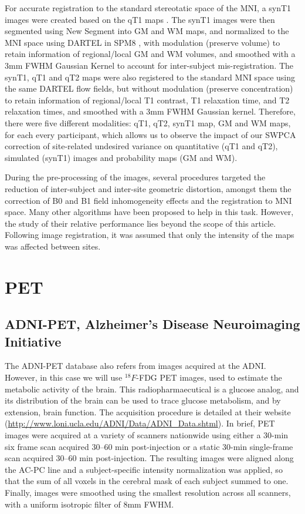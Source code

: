 For accurate registration to the standard stereotatic space of the \ac{MNI}, a \ac{synT1} images were created based on the \ac{qT1} maps \cite{Ecker2013,Ecker2012,Lai2012}. The \ac{synT1} images were then segmented using New Segment into \ac{GM} and \ac{WM} maps, and normalized to the \ac{MNI} space using DARTEL in SPM8 \cite{spm_book}, with modulation (preserve volume) to retain information of regional/local \ac{GM} and \ac{WM} volumes, and smoothed with a 3mm FWHM Gaussian Kernel to account for inter-subject mis-registration. The \ac{synT1}, \ac{qT1} and \ac{qT2} maps were also registered to the standard \ac{MNI} space using the same DARTEL flow fields, but without modulation (preserve concentration) to retain information of regional/local T1 contrast, T1 relaxation time, and T2 relaxation times, and smoothed with a 3mm FWHM Gaussian kernel. Therefore, there were five different modalities: \ac{qT1}, \ac{qT2}, \ac{synT1} map, \ac{GM} and \ac{WM} maps, for each every participant, which allows us to observe the impact of our \ac{SWPCA} correction of site-related undesired variance on quantitative (\ac{qT1} and \ac{qT2}), simulated (\ac{synT1}) images and probability maps (\ac{GM} and \ac{WM}).
	
During the pre-processing of the images, several procedures targeted the reduction of inter-subject and inter-site geometric distortion, amongst them the correction of B0 and B1 field inhomogeneity effects and the registration to \ac{MNI} space. Many other algorithms have been proposed to help in this task. However, the study of their relative performance lies beyond the scope of this article. Following image registration, it was assumed that only the intensity of the maps was affected between sites.

\section{\acs{PET}}
\subsection{ADNI-PET, Alzheimer's Disease Neuroimaging Initiative}\label{sec:adnipet}
The ADNI-PET database also refers from images acquired at the \ac{ADNI}. However, in this case we will use $^{18}F$-FDG \ac{PET} images, used to estimate the metabolic activity of the brain. This radiopharmaecutical is a glucose analog, and its distribution of the brain can be used to trace glucose metabolism, and by extension, brain function. The acquisition procedure is detailed at their website (\url{http://www.loni.ucla.edu/ADNI/Data/ADNI_Data.shtml}). In brief, \ac{PET} images were acquired at a variety of scanners nationwide using either a 30-min six frame scan acquired 30–60 min post-injection or a static 30-min single-frame scan acquired 30–60 min post-injection. The resulting images were aligned along the AC-PC line and a subject-specific intensity normalization was applied, so that the sum of all voxels in the cerebral mask of each subject summed to one. Finally, images were smoothed using the smallest resolution across all scanners, with a uniform isotropic filter of 8mm FWHM. 

